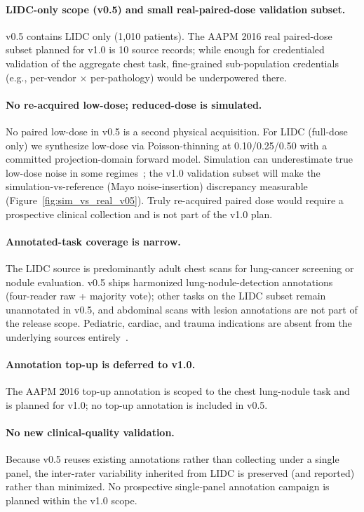 \documentclass[twoside,11pt]{article}
\begin{document}
\paragraph{LIDC-only scope (v0.5) and small real-paired-dose validation subset.} v0.5 contains LIDC only (1{,}010 patients). The AAPM 2016 real paired-dose subset planned for v1.0 is 10 source records; while enough for credentialed validation of the aggregate chest task, fine-grained sub-population credentials (e.g., per-vendor $\times$ per-pathology) would be underpowered there.

\paragraph{No re-acquired low-dose; reduced-dose is simulated.} No paired low-dose in v0.5 is a second physical acquisition. For LIDC (full-dose only) we synthesize low-dose via Poisson-thinning at 0.10/0.25/0.50 with a committed projection-domain forward model. Simulation can underestimate true low-dose noise in some regimes~\citep{wang2020deeplearningreview}; the v1.0 validation subset will make the simulation-vs-reference (Mayo noise-insertion) discrepancy measurable (Figure~\ref{fig:sim_vs_real_v05}). Truly re-acquired paired dose would require a prospective clinical collection and is not part of the v1.0 plan.

\paragraph{Annotated-task coverage is narrow.} The LIDC source is predominantly adult chest scans for lung-cancer screening or nodule evaluation. v0.5 ships harmonized lung-nodule-detection annotations (four-reader raw + majority vote); other tasks on the LIDC subset remain unannotated in v0.5, and abdominal scans with lesion annotations are not part of the release scope. Pediatric, cardiac, and trauma indications are absent from the underlying sources entirely~\citep{larson2018pediatric}.

\paragraph{Annotation top-up is deferred to v1.0.} The AAPM 2016 top-up annotation is scoped to the chest lung-nodule task and is planned for v1.0; no top-up annotation is included in v0.5.

\paragraph{No new clinical-quality validation.} Because v0.5 reuses existing annotations rather than collecting under a single panel, the inter-rater variability inherited from LIDC is preserved (and reported) rather than minimized. No prospective single-panel annotation campaign is planned within the v1.0 scope.
\end{document}
